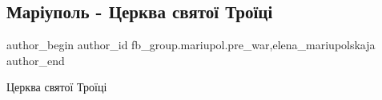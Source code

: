  
 
 
 
 

\subsection{Маріуполь - Церква святої Троїці}
\label{sec:31_01_2023.fb.fb_group.mariupol.pre_war.1.mar_upol___tserkva_s}
 
\ifcmt
 author_begin
   author_id fb_group.mariupol.pre_war,elena_mariupolskaja
 author_end
\fi

Церква святої Троїці

